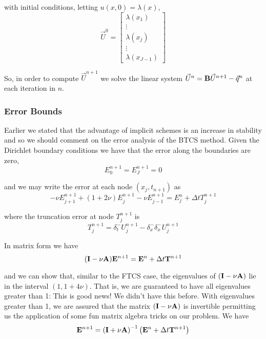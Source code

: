\documentclass[12pt]{article}
\newlength\tindent
\renewcommand{\indent}{\hspace*{\tindent}}
\begin{document}
with initial conditions, letting $u(x, 0) = \lambda(x)$,
\begin{equation*}
	\vec{U}^0 =
	\begin{bmatrix}
		\lambda(x_1) \\
		\vdots \\
		\lambda(x_j) \\
		\vdots \\
		\lambda(x_{J - 1})
	\end{bmatrix}
\end{equation*}

\indent So, in order to compute $\vec{U}^{n + 1}$ we solve the linear system $\vec{U}^n = {\bf B}\vec{U}^{n + 1} - \vec{q}^n$ at each iteration in $n$.


\subsubsection{Error Bounds}
\indent Earlier we stated that the advantage of implicit schemes is an increase in stability and so we should comment on the error analysis of the BTCS method. Given the Dirichlet boundary conditions we have that the error along the boundaries are zero,
\begin{equation*}
	E^{n + 1}_0 = E^{n + 1}_J = 0
\end{equation*}

and we may write the error at each node $(x_j, t_{n + 1})$ as
\begin{equation*}
	-\nu E^{n + 1}_{j + 1} + (1 + 2\nu)E^{n + 1}_j - \nu E^{n + 1}_{j - 1} = E^n_j + \Delta t T^{n + 1}_j
\end{equation*}

where the truncation error at node $T^{n + 1}_j$ is
\begin{equation*}
	T^{n + 1}_j = \delta^-_t U^{n + 1}_j - \delta^-_x\delta^-_x U^{n + 1}_j
\end{equation*}

In matrix form we have
\begin{equation*}
	({\bf I} - \nu{\bf A}){\bf E}^{n + 1} = {\bf E}^n + \Delta t {\bf T}^{n + 1}
\end{equation*}

and we can show that, similar to the FTCS case, the eigenvalues of $({\bf I} - \nu{\bf A})$ lie in the interval $(1, 1 + 4\nu)$. That is, we are guaranteed to have all eigenvalues greater than 1: This is good news! We didn't have this before. With eigenvalues greater than 1, we are assured that the matrix $({\bf I} - \nu{\bf A})$ is invertible permitting us the application of some fun matrix algebra tricks on our problem. We have
\begin{equation*}
	{\bf E}^{n + 1} = \left({\bf I} + \nu{\bf A}\right)^{-1} \left({\bf E}^n + \Delta t {\bf T}^{n + 1} \right)
\end{equation*}
\end{document}

